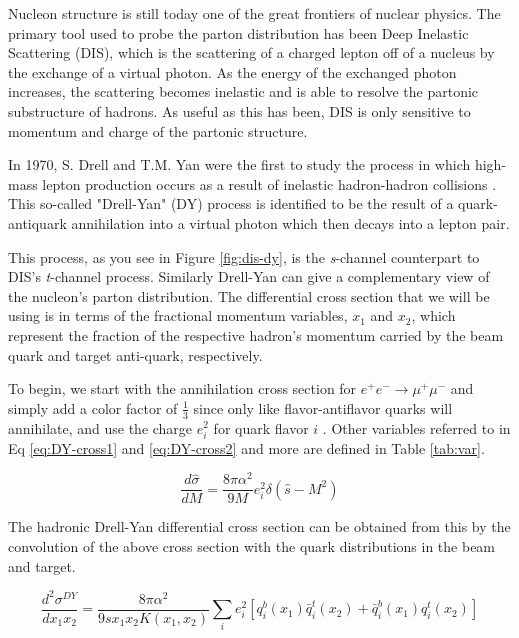 \documentclass[11pt]{article}
\begin{document}
Nucleon structure is still today one of the great frontiers of nuclear physics.  The primary tool used to probe the parton distribution has been Deep Inelastic Scattering (DIS), which is the scattering of a charged lepton off of a nucleus by the exchange of a virtual photon.  As the energy of the exchanged photon increases, the scattering becomes inelastic and is able to resolve the partonic substructure of hadrons.  As useful as this has been, DIS is only sensitive to momentum and charge of the partonic structure.

In 1970, S. Drell and T.M. Yan were the first to study the process in which high-mass lepton production occurs as a result of inelastic hadron-hadron collisions \cite{Drell:1970wh}.  This so-called "Drell-Yan" (DY) process is identified to be the result of a quark-antiquark annihilation into a virtual photon which then decays into a lepton pair. 

This process, as you see in Figure \ref{fig:dis-dy}, is the \emph{s}-channel counterpart to DIS's \emph{t}-channel process.  Similarly Drell-Yan can give a complementary view of the nucleon's parton distribution. The differential cross section that we will be using is in terms of the fractional momentum variables, $x_1$ and $x_2$, which represent the fraction of the respective hadron's momentum carried by the beam quark and target anti-quark, respectively.

To begin, we start with the annihilation cross section for $e^+e^- \rightarrow \mu^+\mu^-$ and simply add a color factor of $\frac{1}{3}$ since only like flavor-antiflavor quarks will annihilate, and use the charge $e_i^2$ for quark flavor $i$ \cite{duan-2007-50}. Other variables referred to in Eq \ref{eq:DY-cross1} and \ref{eq:DY-cross2} and more are defined in Table \ref{tab:var}.

\begin{equation}
	\frac{d\hat{\sigma}}{dM} = \frac{8 \pi \alpha^2}{9M}e_i^2\delta(\hat{s} - M^2)
	\label{eq:DY-cross1}
\end{equation}

The hadronic Drell-Yan differential cross section can be obtained from this by the convolution of the above cross section with the quark distributions in the beam and target.

\begin{equation}
	\frac{d^2\sigma^{DY}}{dx_1x_2}=\frac{8\pi\alpha^2}{9sx_1x_2 K(x_1,x_2)}
	 \sum_{i}e_i^2[q_i^b(x_1)\bar{q}_i^t(x_2)+
	\bar{q}_i^b(x_1)q_i^t(x_2)]
\label{eq:DY-cross2}
\end{equation}
\end{document}
